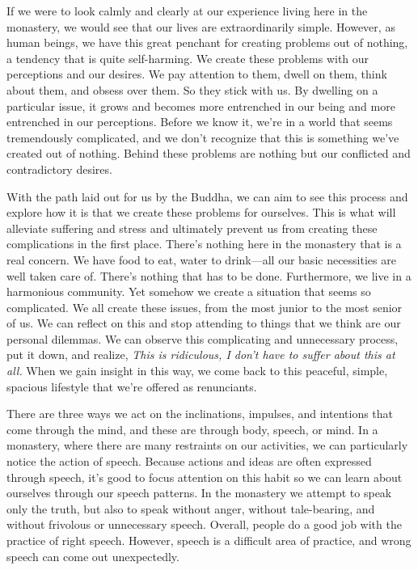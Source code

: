 If we were to look calmly and clearly at our experience living here in 
the monastery, we would see that our lives are extraordinarily simple. 
However, as human beings, we have this great penchant for creating 
problems out of nothing, a tendency that is quite self-harming. We 
create these problems with our perceptions and our desires. We pay 
attention to them, dwell on them, think about them, and obsess over 
them. So they stick with us. By dwelling on a particular issue, it 
grows and becomes more entrenched in our being and more entrenched in 
our perceptions. Before we know it, we're in a world that seems 
tremendously complicated, and we don't recognize that this is something 
we've created out of nothing. Behind these problems are nothing but our 
conflicted and contradictory desires.

With the path laid out for us by the Buddha, we can aim to see this 
process and explore how it is that we create these problems for 
ourselves. This is what will alleviate suffering and stress and 
ultimately prevent us from creating these complications in the first 
place. There's nothing here in the monastery that is a real concern. We 
have food to eat, water to drink---all our basic necessities are well 
taken care of. There's nothing that has to be done. Furthermore, we 
live in a harmonious community. Yet somehow we create a situation that 
seems so complicated. We all create these issues, from the most junior 
to the most senior of us. We can reflect on this and stop attending to 
things that we think are our personal dilemmas. We can observe this 
complicating and unnecessary process, put it down, and realize, 
\emph{This is ridiculous, I don't have to suffer about this at all.} 
When we gain insight in this way, we come back to this peaceful, 
simple, spacious lifestyle that we're offered as renunciants.


There are three ways we act on the inclinations, impulses, and 
intentions that come through the mind, and these are through body, 
speech, or mind. In a monastery, where there are many restraints on our 
activities, we can particularly notice the action of speech. Because 
actions and ideas are often expressed through speech, it's good to 
focus attention on this habit so we can learn about ourselves through 
our speech patterns. In the monastery we attempt to speak only the 
truth, but also to speak without anger, without tale-bearing, and 
without frivolous or unnecessary speech. Overall, people do a good job 
with the practice of right speech. However, speech is a difficult area 
of practice, and wrong speech can come out unexpectedly.

